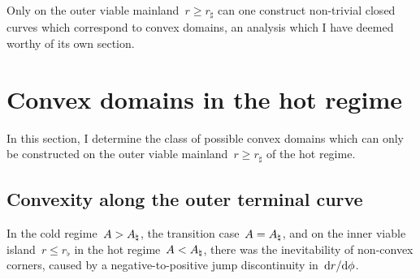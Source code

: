 Only on the outer viable mainland~$r \ge r_\sharp$
can one construct non-trivial closed curves
which correspond to convex domains,
an analysis which I have deemed worthy of its own section.

\section{Convex domains in the hot regime}
\label{sec:line.convex}

In this section,
I determine the class of possible convex domains
which can only be constructed
on the outer viable mainland~$r \ge r_\sharp$
of the hot regime.

\subsection{Convexity along the outer terminal curve}
\label{sec:line.convex.terminal}

In the cold regime~$A > A_\natural$, the transition case~$A = A_\natural$,
and on the inner viable island~$r \le r_\flat$
in the hot regime~$A < A_\natural$,
there was the inevitability of non-convex corners,
caused by a negative-to-positive jump discontinuity in~$\mathop{}\!\mathrm{d} r / {\mathop{}\!\mathrm{d}\phi}$.

